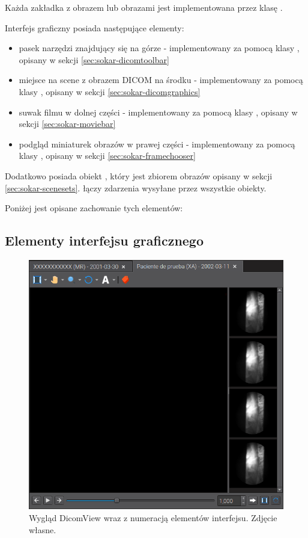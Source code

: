 
Każda zakładka z obrazem lub obrazami jest implementowana przez klasę .

Interfejs graficzny  posiada następujące elementy:
\begin{itemize}
    \item pasek narzędzi znajdujący się na górze - implementowany za pomocą klasy , opisany w sekcji \ref{sec:sokar-dicomtoolbar}
    \item miejsce na scene z obrazem DICOM na środku - implementowany za pomocą klasy , opisany w sekcji \ref{sec:sokar-dicomgraphics}
    \item suwak filmu w dolnej części - implementowany za pomocą klasy , opisany w sekcji \ref{sec:sokar-moviebar}
    \item podgląd miniaturek obrazów w prawej części - implementowany za pomocą klasy , opisany w sekcji \ref{sec:sokar-framechooser}
\end{itemize}

Dodatkowo posiada obiekt , który jest zbiorem obrazów opisany w sekcji \ref{sec:sokar-scenesets}.
 łączy zdarzenia wysyłane przez wszystkie obiekty.

Poniżej jest opisane zachowanie tych elementów:

\subsection{Elementy interfejsu graficznego}

\begin{figure}[!htbp]
    \centering
    \includegraphics[width=\textwidth]{img/sokar-dicomview-001.png}
    \caption{Wygląd DicomView wraz z numeracją elementów interfejsu. Zdjęcie własne.}
    \label{fig:sokar-dicomview001}
\end{figure}

